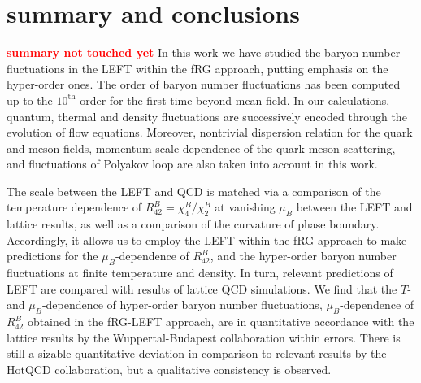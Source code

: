 \documentclass[%
reprint,
superscriptaddress,
showpacs,preprintnumbers,
amsmath,amssymb,
aps,
prd,
]{revtex4-1}
\newcommand{\coljan}[1]{\textcolor{red}{#1}}
\begin{document}
	\section{summary and conclusions}
	\label{sec:summary}
	
	\coljan{\bf summary not touched yet}
	In this work we have studied the baryon number fluctuations in the LEFT within the fRG approach, putting emphasis on the hyper-order ones. The order of baryon number fluctuations has been computed up to the $10^{\mathrm{th}}$ order for the first time beyond mean-field. In our calculations, quantum, thermal and density fluctuations are successively encoded through the evolution of flow equations. Moreover, nontrivial dispersion relation for the quark and meson fields, momentum scale dependence of the quark-meson scattering, and fluctuations of Polyakov loop are also taken into account in this work.
	
	The scale between the LEFT and QCD is matched via a comparison of the temperature dependence of $R^{B}_{42}=\chi^{B}_{4}/\chi^{B}_{2}$ at vanishing $\mu_B$ between the LEFT and lattice results, as well as a comparison of the curvature of phase boundary. Accordingly, it allows us to employ the LEFT within the fRG approach to make predictions for the $\mu_B$-dependence of $R^{B}_{42}$, and the hyper-order baryon number fluctuations at finite temperature and density. In turn, relevant predictions of LEFT are compared with results of lattice QCD simulations. We find that the $T$- and $\mu_B$-dependence of hyper-order baryon number fluctuations, $\mu_B$-dependence of $R^{B}_{42}$ obtained in the fRG-LEFT approach, are in quantitative accordance with the lattice results by the Wuppertal-Budapest collaboration within errors. There is still a sizable quantitative deviation in comparison to relevant results by the HotQCD collaboration, but a qualitative consistency is observed.
	
\end{document}
